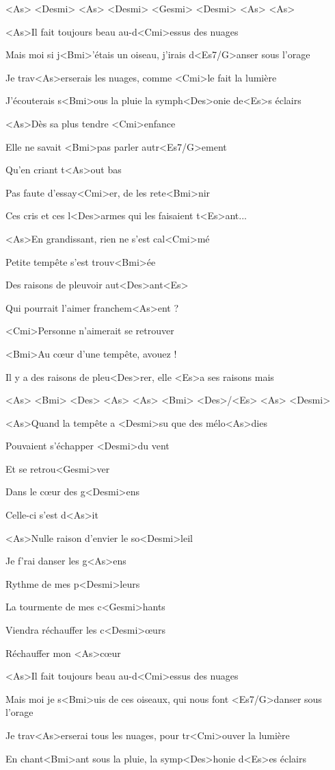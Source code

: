 

<As> <Desmi> <As> <Desmi>
<Gesmi> <Desmi> <As> <As>

\zr
<As>Il fait toujours beau au-d<Cmi>essus des nuages

Mais moi si j<Bmi>'étais un oiseau, j'irais d<Es7/G>anser sous l'orage

Je trav<As>erserais les nuages, comme <Cmi>le fait la lumière

J'écouterais s<Bmi>ous la pluie la symph<Des>onie de<Es>s éclairs
\kr

\zs
<As>Dès sa plus tendre <Cmi>enfance

Elle ne savait <Bmi>pas parler autr<Es7/G>ement

Qu'en criant t<As>out bas

Pas faute d'essay<Cmi>er, de les rete<Bmi>nir

Ces cris et ces l<Des>armes qui les faisaient t<Es>ant...
\ks

\zr\kr

\zs
<As>En grandissant, rien ne s'est cal<Cmi>mé

Petite tempête s'est trouv<Bmi>ée

Des raisons de pleuvoir aut<Des>ant<Es>

Qui pourrait l'aimer franchem<As>ent ?

<Cmi>Personne n'aimerait se retrouver

<Bmi>Au cœur d'une tempête, avouez !

Il y a des raisons de pleu<Des>rer, elle <Es>a ses raisons mais
\ks

\zr\kr

<As> <Bmi> <Des> <As>
<As> <Bmi> <Des>/<Es> <As> <Desmi>

\zs
<As>Quand la tempête a <Desmi>su que des mélo<As>dies

Pouvaient s'échapper <Desmi>du vent

Et se retrou<Gesmi>ver

Dans le cœur des g<Desmi>ens

Celle-ci s'est d<As>it

<As>Nulle raison d'envier le so<Desmi>leil

Je f'rai danser les g<As>ens

Rythme de mes p<Desmi>leurs

La tourmente de mes c<Gesmi>hants

Viendra réchauffer les c<Desmi>œurs

Réchauffer mon <As>cœur
\ks

\zr
<As>Il fait toujours beau au-d<Cmi>essus des nuages

Mais moi je s<Bmi>uis de ces oiseaux, qui nous font <Es7/G>danser sous l'orage

Je trav<As>erserai tous les nuages, pour tr<Cmi>ouver la lumière

En chant<Bmi>ant sous la pluie, la symp<Des>honie d<Es>es éclairs
\kr

\kp
